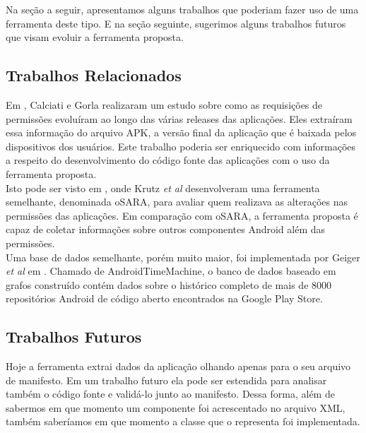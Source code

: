 \documentclass[a4paper,12pt]{article}
\begin{document}
{Na seção a seguir, apresentamos alguns trabalhos que poderiam fazer uso de uma ferramenta deste tipo. E na seção seguinte, sugerimos alguns trabalhos futuros que visam evoluir a ferramenta proposta.


\subsection{Trabalhos Relacionados}%

Em \cite{Calciati}, Calciati e Gorla realizaram um estudo sobre como as requisições de permissões evoluíram ao longo das várias releases das aplicações. Eles extraíram essa informação do arquivo APK, a versão final da aplicação que é baixada pelos dispositivos dos usuários. Este trabalho poderia ser enriquecido com informações a respeito do desenvolvimento do código fonte das aplicações com o uso da ferramenta proposta. \\

Isto pode ser visto em \cite{WhoAdded}, onde Krutz \textit{et al} desenvolveram uma ferramenta semelhante, denominada oSARA, para avaliar quem realizava as alterações nas permissões das aplicações. Em comparação com oSARA, a ferramenta proposta é capaz de coletar informações sobre outros componentes Android além das permissões.\\

Uma base de dados semelhante, porém muito maior, foi implementada por Geiger \textit{et al} em \cite{graphDB}. Chamado de AndroidTimeMachine, o banco de dados baseado em grafos construído contém dados sobre o histórico completo de mais de 8000 repositórios Android de código aberto encontrados na Google Play Store.

\subsection{Trabalhos Futuros}



Hoje a ferramenta extrai dados da aplicação olhando apenas para o seu arquivo de manifesto. Em um trabalho futuro ela pode ser estendida para analisar também o código fonte e validá-lo junto ao manifesto. Dessa forma, além de sabermos em que momento um componente foi acrescentado no arquivo XML, também saberíamos em que momento a classe que o representa foi implementada.

}
\end{document}
